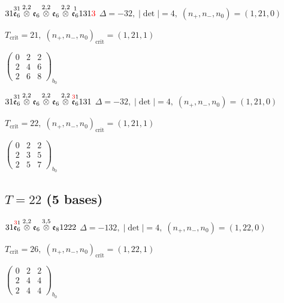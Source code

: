 \documentclass[10pt]{article}
\begin{document}
$31\overset{31}{\mathfrak{e}_6}\overset{2,2}{\otimes}\mathfrak{e}_6\overset{2,2}{\otimes}\mathfrak{e}_6\overset{2,2}{\otimes}\overset{1}{\mathfrak{e}_6}131\textcolor{red}{3}$ \quad $\Delta=-32,\; |\det|=4,\; (n_+,n_-,n_0)=(1,21,0)$

\hspace{1em}$T_{\text{crit}}=21,\; (n_+,n_-,n_0)_{\text{crit}}=(1,21,1)$

\hspace{2em}$\left(\begin{smallmatrix}0 & 2 & 2 \\ 2 & 4 & 6 \\ 2 & 6 & 8\end{smallmatrix}\right)_{\!b_0}$

$31\overset{31}{\mathfrak{e}_6}\overset{2,2}{\otimes}\mathfrak{e}_6\overset{2,2}{\otimes}\mathfrak{e}_6\overset{2,2}{\otimes}\overset{\textcolor{red}{3}1}{\mathfrak{e}_6}131$ \quad $\Delta=-32,\; |\det|=4,\; (n_+,n_-,n_0)=(1,21,0)$

\hspace{1em}$T_{\text{crit}}=22,\; (n_+,n_-,n_0)_{\text{crit}}=(1,21,1)$

\hspace{2em}$\left(\begin{smallmatrix}0 & 2 & 2 \\ 2 & 3 & 5 \\ 2 & 5 & 7\end{smallmatrix}\right)_{\!b_0}$


\subsection*{$T = 22$ \quad (5 bases)}
\smallskip

$31\overset{\textcolor{red}{3}1}{\mathfrak{e}_6}\overset{2,2}{\otimes}\mathfrak{e}_6\overset{3,5}{\otimes}\mathfrak{e}_81222$ \quad $\Delta=-132,\; |\det|=4,\; (n_+,n_-,n_0)=(1,22,0)$

\hspace{1em}$T_{\text{crit}}=26,\; (n_+,n_-,n_0)_{\text{crit}}=(1,22,1)$

\hspace{2em}$\left(\begin{smallmatrix}0 & 2 & 2 \\ 2 & 4 & 4 \\ 2 & 4 & 4\end{smallmatrix}\right)_{\!b_0}$
\end{document}
